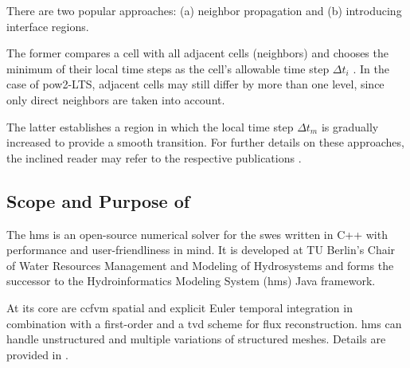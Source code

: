 There are two popular approaches: (a) neighbor propagation and (b) introducing interface regions.

The former compares a cell with all adjacent cells (neighbors) and chooses the minimum of their local time steps as the cell's allowable time step $\Delta t_i$ \autocite{sanders2008,yang2020}.
In the case of \gls{pow2-LTS}, 
adjacent cells may still differ by more than one level,
since only direct neighbors are taken into account.

The latter establishes a region in which the local time step $\Delta t_m$ is gradually increased to provide a smooth transition. 
For further details on these approaches, the inclined reader may refer to the respective publications
\autocite{crossley2003,dazzi2018,hu2019,kleb1992}.

\subsection{Scope and Purpose of \texorpdfstring{\hms}{hms++}}\label{sec:hms-scope-purpose}

The \gls{hms} is an open-source numerical solver for the \glspl{swe} written in C++ with performance and user-friendliness in mind. 
It is developed at TU Berlin's Chair of Water Resources Management and Modeling of Hydrosystems and forms the successor to the Hydroinformatics Modeling System (hms) Java framework.

At its core are \gls{ccfvm} spatial and explicit Euler temporal integration in combination with a first-order and a \gls{tvd} scheme for flux reconstruction.
\gls{hms} can handle unstructured and multiple variations of structured meshes.
Details are provided in \textcite{lennart-conf,lennart-hms}.


